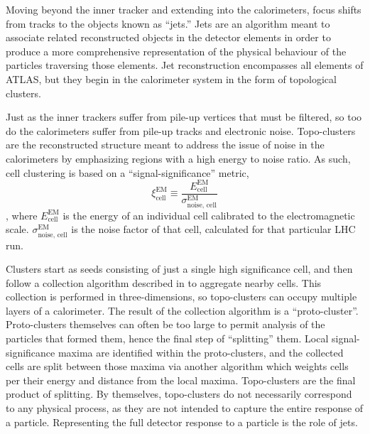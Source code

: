         Moving beyond the inner tracker and extending into the calorimeters,
            focus shifts from tracks to the objects known as ``jets.''
        Jets are an algorithm meant to associate related reconstructed objects in the detector elements
            in order to produce a more comprehensive representation of the physical behaviour of the particles traversing those elements.
        Jet reconstruction encompasses all elements of ATLAS,
            but they begin in the calorimeter system in the form of topological clusters.

        Just as the inner trackers suffer from pile-up vertices that must be filtered,
            so too do the calorimeters suffer from pile-up tracks and electronic noise.
        Topo-clusters are the reconstructed structure meant to address the issue of noise in the calorimeters
            by emphasizing regions with a high energy to noise ratio.
        As such, cell clustering is based on a ``signal-significance'' metric,
        \begin{equation}
            \xi^{\textrm{EM}}_{\textrm{cell}} \equiv \frac{
                E^{\textrm{EM}}_{\textrm{cell}} }{
                \sigma^{\textrm{EM}}_{\textrm{noise, cell}} }
        \end{equation} ,
            where $E^{\textrm{EM}}_{\textrm{cell}}$ is the energy of an individual cell calibrated to the electromagnetic scale.
        $\sigma^{\textrm{EM}}_{\textrm{noise, cell}}$ is the noise factor of that cell, calculated for that particular LHC run.

        Clusters start as seeds consisting of just a single high significance cell,
            and then follow a collection algorithm described in \cite{cell_clustering} to aggregate nearby cells.
        This collection is performed in three-dimensions, so topo-clusters can occupy multiple layers of a calorimeter.
        The result of the collection algorithm is a ``proto-cluster''.
        Proto-clusters themselves can often be too large to permit analysis of the particles that formed them,
            hence the final step of ``splitting'' them.
        Local signal-significance maxima are identified within the proto-clusters,
            and the collected cells are split between those maxima via another algorithm
            which weights cells per their energy and distance from the local maxima.
        Topo-clusters are the final product of splitting.
        By themselves, topo-clusters do not necessarily correspond to any physical process,
            as they are not intended to capture the entire response of a particle.
        Representing the full detector response to a particle is the role of jets.

